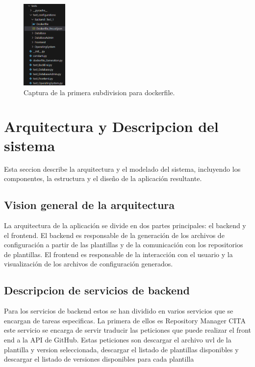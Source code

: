\documentclass[12pt, a4paper, twoside]{article}
\begin{document}
\begin{figure}[ht]
	\centering
	  \includegraphics[width=0.2\textwidth]{organizacion.test.pytest.png}
	\caption{Captura de la primera subdivision para dockerfile.}
\end{figure}




















\section{Arquitectura y Descripcion del sistema }
\label{sec:Arquitectura y Descripcion del sistema}
Esta seccion describe la arquitectura y el modelado del sistema, incluyendo los componentes, la estructura y el diseño de la aplicación resultante.
\subsection{Vision general de la arquitectura }
La arquitectura de la aplicación se divide en dos partes principales: el backend y el frontend.
El backend es responsable de la generación de los archivos de configuración a partir de las plantillas y de la comunicación con los repositorios de plantillas.
El frontend es responsable de la interacción con el usuario y la visualización de los archivos de configuración generados.
\subsection{Descripcion de servicios de backend}
Para los servicios de backend estos se han dividido en varios servicios que se encargan de tareas especificas.
La primera de ellos es Repository Manager CITA este servicio se encarga de servir traducir las peticiones que puede realizar el front end a la API de GitHub.
Estas peticiones son descargar el archivo uvl de la plantilla y version seleccionada, descargar el listado de plantillas disponibles y descargar el listado de versiones disponibles para cada plantilla
\end{document}
